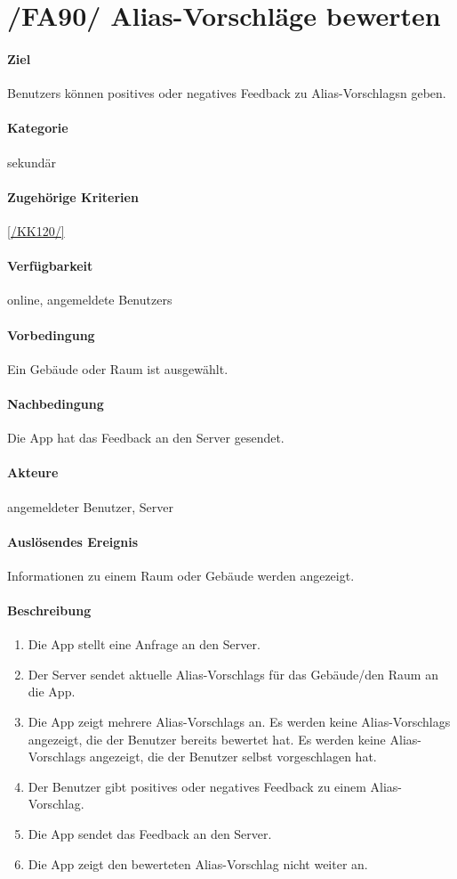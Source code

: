 \section[Alias-Vorschläge bewerten]{/FA90/ Alias-Vorschläge bewerten}
\label{/FA90/}
\paragraph{Ziel}
\Glspl{Benutzer} können positives oder negatives Feedback zu \Glspl{Alias-Vorschlag}n geben.
\paragraph{Kategorie}
sekundär
\paragraph{Zugehörige Kriterien}
\ref{/KK120/}
\paragraph{Verfügbarkeit}
online, angemeldete \Glspl{Benutzer}
\paragraph{Vorbedingung}
Ein Gebäude oder Raum ist ausgewählt.
\paragraph{Nachbedingung}
Die App hat das Feedback an den \Gls{Server} gesendet.
\paragraph{Akteure}
angemeldeter \Gls{Benutzer}, \Gls{Server}
\paragraph{Auslösendes Ereignis}
Informationen zu einem Raum oder Gebäude werden angezeigt.
\paragraph{Beschreibung}
\begin{enumerate}
    \item Die App stellt eine Anfrage an den \Gls{Server}.
    \item Der \Gls{Server} sendet aktuelle \Glspl{Alias-Vorschlag} für das Gebäude/den Raum an die App.
    \item Die App zeigt mehrere \Glspl{Alias-Vorschlag} an. Es werden keine \Glspl{Alias-Vorschlag} angezeigt, die der \Gls{Benutzer} bereits bewertet hat. Es werden keine \Glspl{Alias-Vorschlag} angezeigt, die der \Gls{Benutzer} selbst vorgeschlagen hat.
    \item Der \Gls{Benutzer} gibt positives oder negatives Feedback zu einem \Gls{Alias-Vorschlag}.
    \item Die App sendet das Feedback an den \Gls{Server}.
    \item Die App zeigt den bewerteten \Gls{Alias-Vorschlag} nicht weiter an.
\end{enumerate}